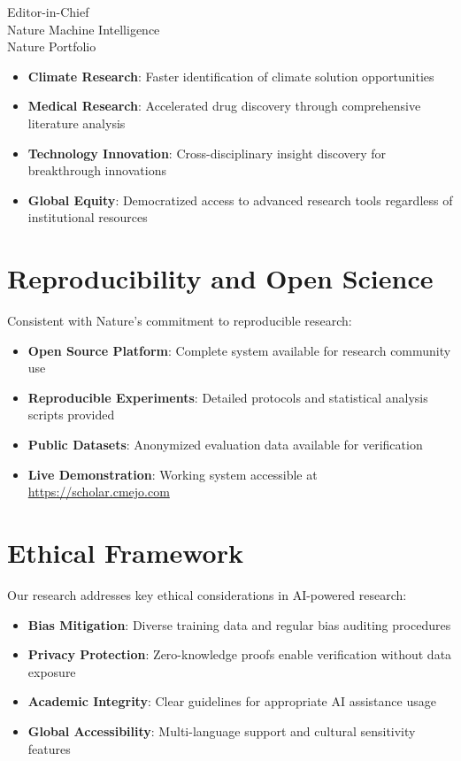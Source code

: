 \documentclass[11pt]{letter}
\begin{document}
\begin{letter}{Editor-in-Chief\\
Nature Machine Intelligence\\
Nature Portfolio}
\begin{itemize}
    \item \textbf{Climate Research}: Faster identification of climate solution opportunities
    \item \textbf{Medical Research}: Accelerated drug discovery through comprehensive literature analysis
    \item \textbf{Technology Innovation}: Cross-disciplinary insight discovery for breakthrough innovations
    \item \textbf{Global Equity}: Democratized access to advanced research tools regardless of institutional resources
\end{itemize}

\section*{Reproducibility and Open Science}

Consistent with Nature's commitment to reproducible research:

\begin{itemize}
    \item \textbf{Open Source Platform}: Complete system available for research community use
    \item \textbf{Reproducible Experiments}: Detailed protocols and statistical analysis scripts provided
    \item \textbf{Public Datasets}: Anonymized evaluation data available for verification
    \item \textbf{Live Demonstration}: Working system accessible at \url{https://scholar.cmejo.com}
\end{itemize}

\section*{Ethical Framework}

Our research addresses key ethical considerations in AI-powered research:

\begin{itemize}
    \item \textbf{Bias Mitigation}: Diverse training data and regular bias auditing procedures
    \item \textbf{Privacy Protection}: Zero-knowledge proofs enable verification without data exposure
    \item \textbf{Academic Integrity}: Clear guidelines for appropriate AI assistance usage
    \item \textbf{Global Accessibility}: Multi-language support and cultural sensitivity features
\end{itemize}


\end{letter}
\end{document}
